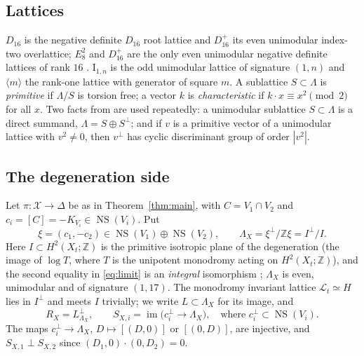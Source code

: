 \documentclass[12pt]{article}
\newcommand{\Z}{\mathbb Z}
\newcommand{\NS}{\operatorname{NS}}
\newcommand{\im}{\operatorname{im}}
\newcommand{\calX}{\mathcal X}
\newcommand{\calL}{\mathcal L}
\newcommand{\I}{\mathrm{I}}
\theoremstyle{definition}
\theoremstyle{remark}
\begin{document}
\subsection{Lattices}

\(D_{16}\) is the negative definite \(D_{16}\) root lattice and
\(D_{16}^+\) its even unimodular index-two overlattice; \(E_8^2\) and
\(D_{16}^+\) are the only even unimodular negative definite lattices of
rank \(16\) \cite[\S8]{Se}. \(\I_{1,n}\) is the odd unimodular lattice
of signature \((1,n)\) and \(\langle m\rangle\) the rank-one lattice
with generator of square \(m\). A sublattice \(S\subset\Lambda\) is
\emph{primitive} if \(\Lambda/S\) is torsion free; a vector \(k\) is
\emph{characteristic} if \(k\cdot x\equiv x^2\pmod 2\) for all \(x\).
Two facts from \cite{Ni} are used repeatedly: a unimodular sublattice
\(S\subset\Lambda\) is a direct summand, \(\Lambda=S\oplus S^\perp\);
and if \(v\) is a primitive vector of a unimodular lattice with
\(v^2\neq0\), then \(v^\perp\) has cyclic discriminant group of order
\(|v^2|\).

\subsection{The degeneration side}\label{sec:degside}

Let \(\pi\colon\calX\to\Delta\) be as in Theorem~\ref{thm:main}, with
\(C=V_1\cap V_2\) and \(c_i=[C]=-K_{V_i}\in\NS(V_i)\). Put
\begin{equation}\label{eq:limit}
 \xi=(c_1,-c_2)\in\NS(V_1)\oplus\NS(V_2),\qquad
 \Lambda_X=\xi^\perp/\Z\xi=I^\perp/I .
\end{equation}
Here \(I\subset H^2(X_t;\Z)\) is the primitive isotropic plane of the
degeneration (the image of \(\log T\), where \(T\) is the unipotent
monodromy acting on \(H^2(X_t;\Z)\)), and the second equality in \eqref{eq:limit} is an
\emph{integral} isomorphism \cite[Proposition~3.5]{GT}; \(\Lambda_X\)
is even, unimodular and of signature \((1,17)\). The monodromy
invariant lattice \(\calL_t\simeq H\) lies in \(I^\perp\) and meets
\(I\) trivially; we write \(L\subset\Lambda_X\) for its image, and
\begin{equation}\label{eq:SX}
 R_X=L^\perp_{\Lambda_X},\qquad
 S_{X,i}=\im\bigl(c_i^\perp\longrightarrow\Lambda_X\bigr),
 \quad\text{where } c_i^\perp\subset\NS(V_i).
\end{equation}
The maps \(c_i^\perp\to\Lambda_X\), \(D\mapsto[(D,0)]\) or
\([(0,D)]\), are injective, and \(S_{X,1}\perp S_{X,2}\) since
\((D_1,0)\cdot(0,D_2)=0\).
\end{document}
